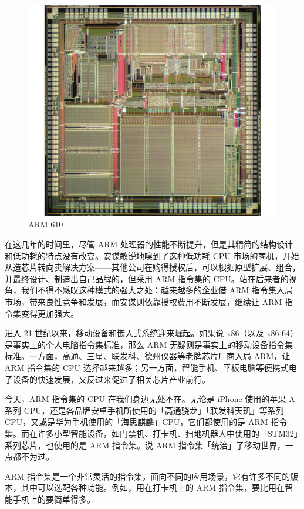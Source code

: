 \begin{figure}[htb!]
  \centering
  \includegraphics[width=.75\textwidth]{assets/surpass/ARM610_die.jpg}
  \caption{ARM 610}
  \label{fig:ARM610_die}
\end{figure}

在这几年的时间里，尽管 ARM 处理器的性能不断提升，但是其精简的结构设计和低功耗的特点没有改变。安谋敏锐地嗅到了这种低功耗 CPU 市场的商机，开始从造芯片转向卖解决方案——其他公司在购得授权后，可以根据原型扩展、组合，并最终设计、制造出自己品牌的，但采用 ARM 指令集的 CPU。站在后来者的视角，我们不得不感叹这种模式的强大之处：越来越多的企业借 ARM 指令集入局市场，带来良性竞争和发展，而安谋则依靠授权费用不断发展，继续让 ARM 指令集变得更加强大。

进入 21 世纪以来，移动设备和嵌入式系统迎来崛起。如果说 x86（以及 x86-64）是事实上的个人电脑指令集标准，那么 ARM 无疑则是事实上的移动设备指令集标准。一方面，高通、三星、联发科、德州仪器等老牌芯片厂商入局 ARM，让 ARM 指令集的 CPU 选择越来越多；另一方面，智能手机、平板电脑等便携式电子设备的快速发展，又反过来促进了相关芯片产业前行。

今天，ARM 指令集的 CPU 在我们身边无处不在。无论是 iPhone 使用的苹果 A 系列 CPU，还是各品牌安卓手机所使用的「高通骁龙」「联发科天玑」等系列 CPU，又或是华为手机使用的「海思麒麟」CPU，它们都使用的是 ARM 指令集。而在许多小型智能设备，如门禁机、打卡机、扫地机器人中使用的「STM32」系列芯片，也使用的是 ARM 指令集。说 ARM 指令集「统治」了移动世界，一点都不为过。

\begin{note}
  ARM 指令集是一个非常灵活的指令集，面向不同的应用场景，它有许多不同的版本，其中可以选配各种功能。例如，用在打卡机上的 ARM 指令集，要比用在智能手机上的要简单得多。
\end{note}

